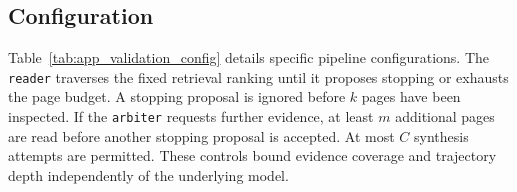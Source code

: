 \subsection{Configuration}
\label{app:method_configuration}

Table~\ref{tab:app_validation_config} details specific pipeline configurations. The \texttt{reader} traverses the fixed retrieval ranking until it proposes stopping or exhausts the page budget. A stopping proposal is ignored before \(k\) pages have been inspected. If the \texttt{arbiter} requests further evidence, at least \(m\) additional pages are read before another stopping proposal is accepted. At most \(C\) synthesis attempts are permitted. These controls bound evidence coverage and trajectory depth independently of the underlying model.

